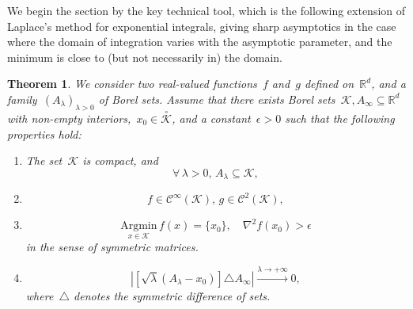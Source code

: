 \documentclass[10pt]{article}
\newcommand{\R}{\mathbb{R}}
\newcommand{\1}{\mathbbm 1}
\newtheorem{theorem}{Theorem}
\begin{document}
        We begin the section by the key technical tool, which is the following extension of Laplace's method for exponential integrals, giving sharp asymptotics in the case where the domain of integration varies with the asymptotic parameter, and the minimum is close to (but not necessarily in) the domain.
        \begin{theorem}
            \label{thm:laplace}
                We consider two real-valued functions~$f$ and~$g$ defined on~$\R^d$, and a family~$(A_\lambda)_{\lambda>0}$ of Borel sets. Assume that there exists Borel sets~$\mathcal K,A_\infty\subseteq \R^d$ with non-empty interiors,~$x_0\in \overset{\circ}{\mathcal K}$, and a constant~$\epsilon >0$ such that the following properties hold:
                \begin{enumerate}[]
                    \item{The set~$\mathcal K$ is compact, and \begin{equation}\label{eq:laplace_l1}\forall\,\lambda >0,\,A_\lambda \subseteq \mathcal K, \tag{\bf L1}\end{equation}}
                    \item{\begin{equation}\label{eq:laplace_l2}f \in \mathcal C^{\infty}(\mathcal K),\, g \in \mathcal C^{2}(\mathcal K), \tag{\bf L2}\end{equation}}
                    \item{\begin{equation}\label{eq:laplace_l3}\underset{x\in\mathcal K}{\mathrm{Argmin}}\,f(x) = \{x_0\},\quad \nabla^2 f(x_0) > \epsilon \tag{\bf L3}\end{equation} in the sense of symmetric matrices.}
                    \item{\begin{equation}\label{eq:laplace_l4} \left|\left[\sqrt\lambda(A_\lambda -x_0)\right] \triangle A_\infty\right| \xrightarrow[]{\lambda \to +\infty}0,\tag{\bf L4}\end{equation}where~$\triangle$ denotes the symmetric difference of sets.}
                \end{enumerate}

\end{theorem}
\end{document}

